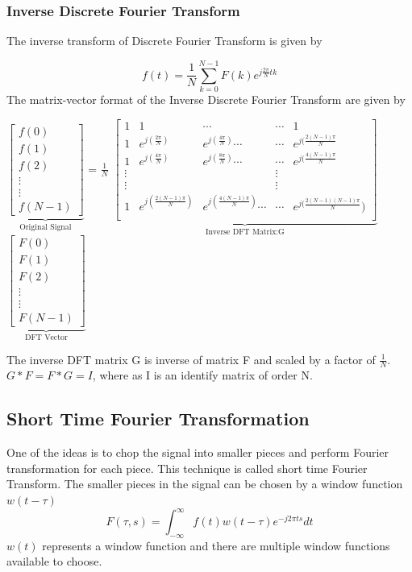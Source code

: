 \subsubsection{Inverse Discrete Fourier Transform}
The inverse transform of Discrete Fourier Transform is given by

\begin{equation}
f(t) = \frac{1}{N}\sum_{k=0}^{N-1} F(k) e^{j\frac{2\pi}{N} tk }
\end{equation}
The matrix-vector format of the Inverse Discrete Fourier Transform are given by

$\underbrace{
\begin{bmatrix}
f(0) \\
f(1) \\
f(2) \\
\vdots \\
\vdots \\
f(N-1)
\end{bmatrix}}_{\text{Original Signal}}$ \!
= $\frac{1}{N}$
$\underbrace{
\begin{bmatrix}
1 & 1 & \cdots & \cdots & 1 \\
1 & e^{j(\frac{2\pi}{N})} & e^{j(\frac{4\pi}{N})}\cdots & \cdots & e^{j(\frac{2(N-1)\pi}{N}} \\
1 & e^{j(\frac{4\pi}{N})} & e^{j(\frac{8\pi}{N})}\cdots & \cdots &  e^{j(\frac{4(N-1)\pi}{N}} \\
\vdots & & & \vdots \\
\vdots & & & \vdots \\
1 & e^{j(\frac{2(N-1)\pi}{N})} & e^{j(\frac{4(N-1)\pi}{N})}\cdots & \cdots & e^{j(\frac{2(N-1)(N-1)\pi}{N}}) \\
\end{bmatrix} }_{\text{Inverse DFT Matrix:G}}$
$\underbrace{
\begin{bmatrix}
F(0) \\ F(1) \\ F(2) \\ \vdots \\ \vdots \\ F(N-1) 
\end{bmatrix}}_{\text{DFT Vector}}$

The inverse DFT matrix G is inverse of matrix F and scaled by a factor of $\frac{1}{N}$. $G * F = F * G = I$, where as I is an identify matrix of order N. 

\subsection{Short Time Fourier Transformation}
 One of the ideas is to chop the signal into smaller pieces and perform Fourier transformation for each piece. This technique is called short time Fourier Transform. The smaller pieces in the signal can be chosen by a window function $w(t-\tau)$
 \begin{equation}
F(\tau,s) = \int_{-\infty}^{\infty}{f(t)w(t-\tau)e^{-j2\pi t s }dt}
\end{equation}
$w(t)$ represents a window function and there are multiple window functions available to choose. 

